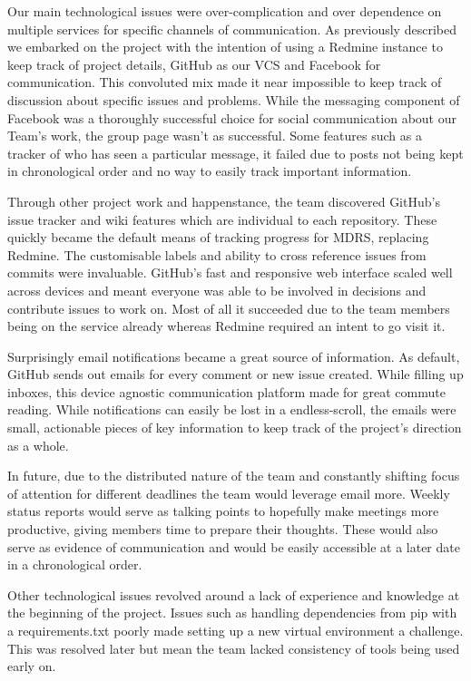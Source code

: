 \documentclass{l3proj}
\begin{document}
Our main technological issues were over-complication
and over dependence on multiple services for specific channels of communication.
As previously described we embarked on the project with the intention of using a
Redmine instance to keep track of project details, GitHub as our VCS and
Facebook for communication. This convoluted mix made it near impossible to keep
track of discussion about specific issues and problems. While the messaging
component of Facebook was a thoroughly successful choice for social
communication about our Team's work, the group page wasn't as successful. Some
features such as a tracker of who has seen a particular message, it failed due
to posts not being kept in chronological order and no way to easily track
important information.

Through other project work and happenstance, the team discovered GitHub's issue
tracker and wiki features which are individual to each repository. These quickly
became the default means of tracking progress for MDRS, replacing Redmine. The
customisable labels and ability to cross reference issues from commits were
invaluable. GitHub's fast and responsive web interface scaled well across
devices and meant everyone was able to be involved in decisions and contribute
issues to work on. Most of all it succeeded due to the team members being on the
service already whereas Redmine required an intent to go visit it.

Surprisingly email notifications became a great source of information. As
default, GitHub sends out emails for every comment or new issue created. While
filling up inboxes, this device agnostic communication platform made for great
commute reading. While notifications can easily be lost in a endless-scroll, the
emails were small, actionable pieces of key information to keep track of the
project's direction as a whole.

In future, due to the distributed nature of the team and constantly shifting
focus of attention for different deadlines the team would leverage email more.
Weekly status reports would serve as talking points to hopefully make meetings
more productive, giving members time to prepare their thoughts. These would also
serve as evidence of communication and would be easily accessible at a later
date in a chronological order.

Other technological issues revolved around a lack of experience and knowledge at
the beginning of the project. Issues such as handling dependencies from pip with
a requirements.txt poorly made setting up a new virtual environment a challenge.
This was resolved later but mean the team lacked consistency of tools being used
early on.
\end{document}
